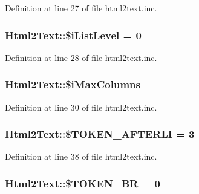 Definition at line 27 of file html2text.\+inc.

\hypertarget{classHtml2Text_a0550556ecb4b3b5de01eab8044c28784}{
\subsubsection[{\$i\+List\+Level}]{\setlength{\rightskip}{0pt plus 5cm}Html2\+Text\+::\$i\+List\+Level = 0}}\label{classHtml2Text_a0550556ecb4b3b5de01eab8044c28784}


Definition at line 28 of file html2text.\+inc.

\hypertarget{classHtml2Text_a0acbcfeaed2a430e528fde413b0549f9}{
\subsubsection[{\$i\+Max\+Columns}]{\setlength{\rightskip}{0pt plus 5cm}Html2\+Text\+::\$i\+Max\+Columns}}\label{classHtml2Text_a0acbcfeaed2a430e528fde413b0549f9}


Definition at line 30 of file html2text.\+inc.

\hypertarget{classHtml2Text_a7c59649ca668432ae1fa144422a6ae2c}{
\subsubsection[{\$\+T\+O\+K\+E\+N\+\_\+\+A\+F\+T\+E\+R\+L\+I}]{\setlength{\rightskip}{0pt plus 5cm}Html2\+Text\+::\$\+T\+O\+K\+E\+N\+\_\+\+A\+F\+T\+E\+R\+L\+I = 3}}\label{classHtml2Text_a7c59649ca668432ae1fa144422a6ae2c}


Definition at line 38 of file html2text.\+inc.

\hypertarget{classHtml2Text_a613470e1fb5059e50cd74119fde8932e}{
\subsubsection[{\$\+T\+O\+K\+E\+N\+\_\+\+B\+R}]{\setlength{\rightskip}{0pt plus 5cm}Html2\+Text\+::\$\+T\+O\+K\+E\+N\+\_\+\+B\+R = 0}}\label{classHtml2Text_a613470e1fb5059e50cd74119fde8932e}


